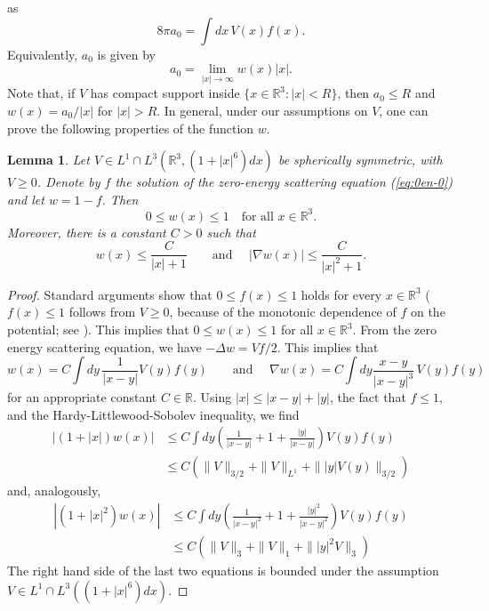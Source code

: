\documentclass[11pt,a4paper]{article}
\newtheorem{lem}[thm]{Lemma}
\newcommand{\bR}{{\mathbb R}}
\begin{document}
as
\[
  8 \pi a_0 = \int dx \, V(x) f(x).
\]
Equivalently, $a_0$ is given by 
\[
  a_0 = \lim_{|x| \to \infty} w(x)|x|.
\]
Note that, if $V$ has compact support inside $\{ x \in \bR^3 : |x| < R \}$, then $a_0 \leq R$ and $w(x) = a_0/|x|$ for $|x| > R$. In general, under our assumptions on $V$, one can prove the following properties of the function $w$.
\begin{lem}\label{lm:w}
Let $V \in L^1 \cap L^3(\bR^3, (1+|x|^6)dx)$ be spherically symmetric, with
$V \geq 0$. Denote by $f$ the solution of the zero-energy scattering
equation (\ref{eq:0en-0}) and let $w = 1 - f$. Then 
\[ 0 \leq w(x) \leq 1 \quad \text{for all } x \in \bR^3. \]
Moreover, there is a constant $C>0$ such that
\begin{equation}\label{eq:bdw} w(x) \leq \frac{C}{|x|+1} \qquad \text{and } \quad  |\nabla w (x)| \leq \frac{C}{|x|^2 + 1}. \end{equation}
\end{lem}
\begin{proof}
Standard arguments show that $0 \leq f (x) \leq 1$ holds for every $x \in \bR^3$ ($f(x) \leq 1$ follows from $V \geq 0$, because of the monotonic dependence of $f$ on the potential; see \cite[Appendix C]{LSSY}). This implies that $0 \leq w (x) \leq 1$ for all $x \in \bR^3$. From the zero energy scattering equation, we have $-\Delta w = Vf /2$. This implies that 
\[ w(x) = C \int dy \, \frac{1}{|x-y|} V (y) f (y) \qquad \text{and } \quad  \nabla w (x) = C \int dy \frac{x-y}{|x-y|^3} \, V (y) f (y)  \]
for an appropriate constant $C \in \bR$. 
Using $|x| \le  |x-y| + |y|$, the fact that $f \le 1$, and
the Hardy-Littlewood-Sobolev inequality, we find
\begin{align*}
  |(1+|x|)w(x)| & \le C \int dy \left( \frac{1}{|x-y|} + 1 +
\frac{|y|}{|x-y|} \right) V(y) f(y) \\& \le C (\| V \|_{3/2} + \| V \|_{L^1} + \| |y| V(y) \|_{3/2} )
\end{align*}
and, analogously, 
\begin{align*}
\left| (1+|x|^2) w (x) \right| &\leq C \int dy \left( \frac{1}{|x-y|^2} + 1 + \frac{|y|^2}{|x-y|^2} \right) V(y) f (y) 
\\ &\leq C \left( \| V \|_3 + \| V \|_1 + \| |y|^2 V \|_3 \right) 
\end{align*}
The right hand side of the last two equations is bounded under the assumption $V \in L^1 \cap L^3 ((1+|x|^6) dx)$. 
\end{proof}
\end{document}
